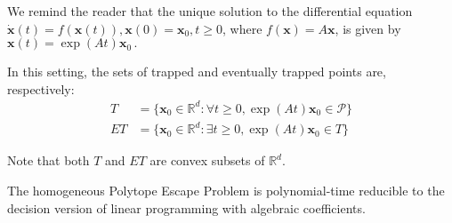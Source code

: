 We remind the reader that the unique solution to the differential equation $\dot{\boldsymbol{x}}(t)=f(\boldsymbol{x}(t)),\boldsymbol{x}(0)=\boldsymbol{x}_{0},t\geq 0$, where $f(\boldsymbol{x})=A\boldsymbol{x}$, is given by
$\boldsymbol{x}(t)=\exp(At)\boldsymbol{x}_{0} \, .$

In this setting, the sets of trapped and eventually trapped points are, respectively:
\begin{align*}
\mathit{T}&=\lbrace \boldsymbol{x}_0\in\mathbb{R}^{d}: \forall t\geq 0, \exp(At)\boldsymbol{x}_{0} \in \mathcal{P}\rbrace\\
\mathit{ET}&=\lbrace\boldsymbol{x}_{0}\in\mathbb{R}^{d}:\exists t\geq 0,\exp(At)\boldsymbol{x}_{0}\in\mathit{T}\rbrace
\end{align*}

Note that both $\mathit{T}$ and $\mathit{ET}$ are convex subsets of $\mathbb{R}^d$.

\begin{lemma}
  The homogeneous Polytope Escape Problem is polynomial-time
  reducible to the decision version of linear programming with
  algebraic coefficients.
\end{lemma}

